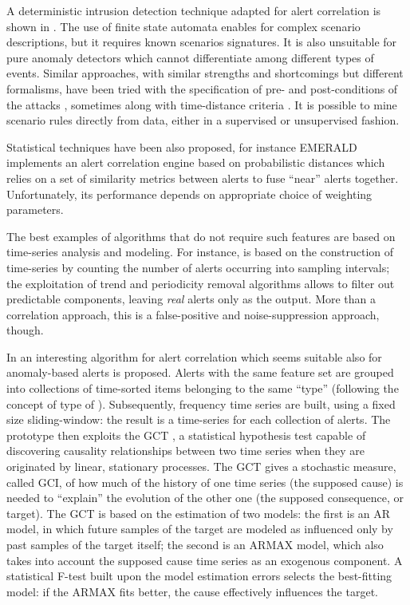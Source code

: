 A deterministic intrusion detection technique adapted for alert
correlation is shown in \citep{STATL}. The use of finite state
automata enables for complex scenario descriptions, but it requires
known scenarios signatures. It is also unsuitable for pure anomaly
detectors which cannot differentiate among different types of
events. Similar approaches, with similar strengths and shortcomings
but different formalisms, have been tried with the specification of
pre- and post-conditions of the attacks \citep{jigsaw}, sometimes
along with time-distance criteria \citep{ning04techniques}. It is
possible to mine scenario rules directly from data, either in a
supervised \citep{dain-fusing} or unsupervised \citep{episodic_rule}
fashion.

Statistical techniques have been also proposed, for instance
E\-ME\-RALD implements an alert correlation engine based on
probabilistic distances \citep{valdes:raid2001:correlation} which
relies on a set of similarity metrics between alerts to fuse ``near''
alerts together. Unfortunately, its performance depends on appropriate
choice of weighting parameters.

The best examples of algorithms that do not require such features are
based on time-series analysis and modeling. For instance,
\citep{me-alert} is based on the construction of time-series by
counting the number of alerts occurring into sampling intervals; the
exploitation of trend and periodicity removal algorithms allows to
filter out predictable components, leaving \emph{real} alerts only as
the output. More than a correlation approach, this is a false-positive
and noise-suppression approach, though.

In \citep{dblp:conf/raid/qinl03} an interesting algorithm for alert
correlation which seems suitable also for anomaly-based alerts is
proposed. Alerts with the same feature set are grouped into
collections of time-sorted items belonging to the same ``type''
(following the concept of type of \citep{me-alert}). Subsequently,
frequency time series are built, using a fixed size sliding-window:
the result is a time-series for each collection of alerts. The
prototype then exploits the \ac{GCT} \citep{chickegg}, a
statistical hypothesis test capable of discovering causality
relationships between two time series when they are originated by
linear, stationary processes. The \ac{GCT} gives a
stochastic measure, called \ac{GCI}, of how much of the history of one
time series (the supposed cause) is needed to ``explain'' the
evolution of the other one (the supposed consequence, or target). The
\ac{GCT} is based on the estimation of two models: the
first is an \ac{AR} model, in which future samples of the target are
modeled as influenced only by past samples of the target itself; the
second is an \ac{ARMAX} model, which also takes into account the
supposed cause time series as an exogenous component. A statistical
F-test built upon the model estimation errors selects the best-fitting
model: if the \ac{ARMAX} fits better, the cause
effectively influences the target.

